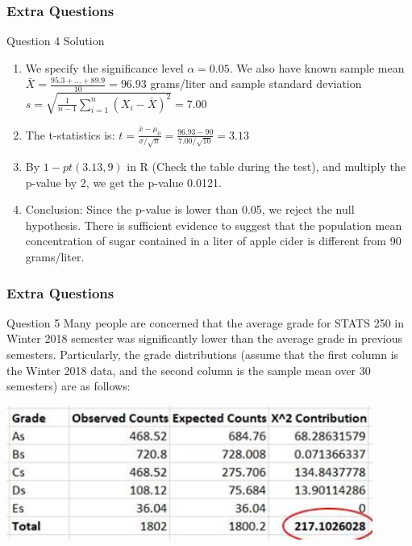 \documentclass{beamer}
\begin{document}

\begin{frame}
\frametitle{Extra Questions}
\begin{block}{Question 4 Solution}

\begin{enumerate}
\item We specify the significance level $\alpha = 0.05$. We also have known sample mean $\bar X = \frac{95.3 + ... + 89.9}{10} = 96.93$ grams/liter and sample standard deviation $s = \sqrt{\frac{1}{n-1}\sum_{i=1}^n (X_i - \bar X)^2} = 7.00$

\item The t-statistics is: $t = \frac{\bar x - \mu_0}{\sigma/\sqrt{n}} = \frac{96.93 - 90}{7.00/\sqrt{10}} = 3.13$

\item By $1 - pt(3.13, 9)$ in R (Check the table during the test), and multiply the p-value by 2, we get the p-value 0.0121.

\item Conclusion: Since the p-value is lower than 0.05, we reject the null hypothesis. There is sufficient evidence to suggest that the population mean concentration of sugar contained in a liter of apple cider is different from 90 grams/liter. 

\end{enumerate}
\end{block}
\end{frame}


\begin{frame}
\frametitle{Extra Questions}
\begin{block}{Question 5}
Many people are concerned that the average grade for STATS 250 in Winter 2018 semester was significantly lower than the average grade in previous semesters. Particularly, the grade distributions (assume that the first column is the Winter 2018 data, and the second column is the sample mean over 30 semesters) are as follows:

\includegraphics[width=0.9\textwidth]{250.png}

\end{block}
\end{frame}
\end{document}
